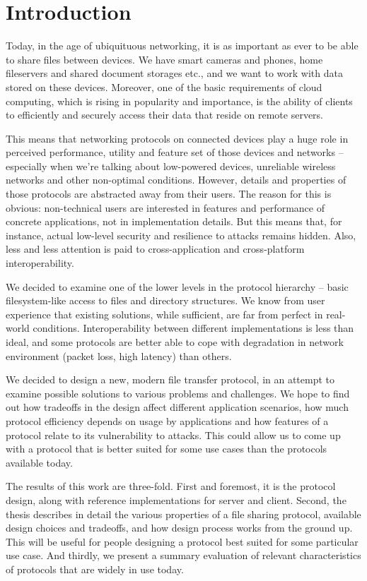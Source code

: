 \chapter*{Introduction}

Today, in the age of ubiquituous networking, it is as important as ever to be able to share files between
devices. We have smart cameras and phones, home fileservers and shared document storages etc., and we want to
work with data stored on these devices. Moreover, one of the basic requirements of cloud computing, which is
rising in popularity and importance, is the ability of clients to efficiently and securely access their data
that reside on remote servers.

This means that networking protocols on connected devices play a huge role in perceived performance, utility
and feature set of those devices and networks -- especially when we're talking about low-powered devices,
unreliable wireless networks and other non-optimal conditions. However, details and properties of those
protocols are abstracted away from their users. The reason for this is obvious: non-technical users are
interested in features and performance of concrete applications, not in implementation details. But this means
that, for instance, actual low-level security and resilience to attacks remains hidden. Also, less and less
attention is paid to cross-application and cross-platform interoperability.

We decided to examine one of the lower levels in the protocol hierarchy -- basic filesystem-like access to
files and directory structures. We know from user experience that existing solutions, while sufficient, are
far from perfect in real-world conditions. Interoperability between different implementations is less than ideal,
and some protocols are better able to cope with degradation in network environment (packet loss, high latency)
than others.

We decided to design a new, modern file transfer protocol, in an attempt to examine possible solutions to
various problems and challenges. We hope to find out how tradeoffs in the design affect different application
scenarios, how much protocol efficiency depends on usage by applications and how features of a protocol relate
to its vulnerability to attacks. This could allow us to come up with a protocol that is better suited for some
use cases than the protocols available today.

The results of this work are three-fold. First and foremost, it is the protocol design, along with reference
implementations for server and client. Second, the thesis describes in detail the various properties of a file
sharing protocol, available design choices and tradeoffs, and how design process works from the ground up.
This will be useful for people designing a protocol best suited for some particular use case. And thirdly, we
present a summary evaluation of relevant characteristics of protocols that are widely in use today.
